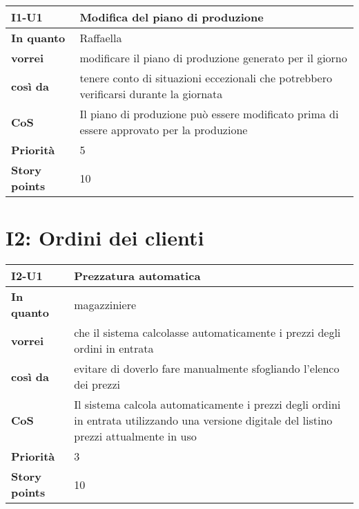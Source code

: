\begin{table}[H]
  \begin{tabularx}{\textwidth}{lX}
    \toprule
    \textbf{I1-U1} & \textbf{Modifica del piano di produzione} \\
    \midrule
    \textbf{In quanto} & Raffaella \\
    \textbf{vorrei} & modificare il piano di produzione generato per il giorno \\
    \textbf{così da} & tenere conto di situazioni eccezionali che potrebbero verificarsi durante la giornata \\
    \midrule
    \textbf{CoS} & Il piano di produzione può essere modificato prima di essere approvato per la produzione \\
    \midrule
    \textbf{Priorità} & 5 \\
    \textbf{Story points} & 10 \\
    \bottomrule
  \end{tabularx}
  \label{user-story:i1-u1}
\end{table}

\section*{I2: Ordini dei clienti}

\begin{table}[H]
  \begin{tabularx}{\textwidth}{lX}
    \toprule
    \textbf{I2-U1} & \textbf{Prezzatura automatica} \\
    \midrule
    \textbf{In quanto} & magazziniere \\
    \textbf{vorrei} & che il sistema calcolasse automaticamente i prezzi degli ordini in entrata \\
    \textbf{così da} & evitare di doverlo fare manualmente sfogliando l'elenco dei prezzi \\
    \midrule
    \textbf{CoS} & Il sistema calcola automaticamente i prezzi degli ordini in entrata utilizzando una versione digitale del listino prezzi attualmente in uso \\
    \midrule
    \textbf{Priorità} & 3 \\
    \textbf{Story points} & 10 \\
    \bottomrule
  \end{tabularx}
  \label{user-story:i2-u1}
\end{table}

